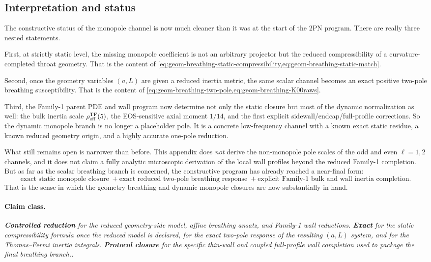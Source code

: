 \documentclass[11pt]{article}
\newcommand{\TwoPN}{\mathrm{2PN}}
\newcommand{\Exact}{\textbf{Exact}}
\newcommand{\Controlled}{\textbf{Controlled reduction}}
\newcommand{\Protocol}{\textbf{Protocol closure}}
\newcommand{\claimclass}[1]{\paragraph{Claim class.}\emph{#1.}}
\begin{document}
\subsection{Interpretation and status}
\label{app:geom-breathing-status}

The constructive status of the monopole channel is now much cleaner than it was at the
start of the \(\TwoPN\) program.
There are really three nested statements.

First, at strictly static level, the missing monopole coefficient is not an arbitrary
projector but the reduced compressibility of a curvature-completed throat geometry.
That is the content of
\cref{eq:geom-breathing-static-compressibility,eq:geom-breathing-static-match}.

Second, once the geometry variables \((a,L)\) are given a reduced inertia metric, the
same scalar channel becomes an exact positive two-pole breathing susceptibility.
That is the content of
\cref{eq:geom-breathing-two-pole,eq:geom-breathing-K00raws}.

Third, the Family-1 parent PDE and wall program now determine not only the static closure
but most of the dynamic normalization as well: the bulk inertia scale
\(\rho_{\rm eff}^{\rm TF}(5)\), the EOS-sensitive axial moment \(1/14\), and the first
explicit sidewall/endcap/full-profile corrections.
So the dynamic monopole branch is no longer a placeholder pole.
It is a concrete low-frequency channel with a known exact static residue, a known reduced
geometry origin, and a highly accurate one-pole reduction.

What still remains open is narrower than before.
This appendix does \emph{not} derive the non-monopole pole scales of the odd and even
\(\ell=1,2\) channels, and it does not claim a fully analytic microscopic derivation of
the local wall profiles beyond the reduced Family-1 completion.
But as far as the scalar breathing branch is concerned, the constructive program has
already reached a near-final form:
\begin{equation}
\boxed{
\text{exact static monopole closure}
\;+
\text{exact reduced two-pole breathing response}
\;+
\text{explicit Family-1 bulk and wall inertia completion}.
}
\label{eq:geom-breathing-final-summary}
\end{equation}
That is the sense in which the geometry-breathing and dynamic monopole closures are now
substantially in hand.

\claimclass{\Controlled{} for the reduced geometry-side model, affine breathing ansatz,
and Family-1 wall reductions.
\Exact{} for the static compressibility formula once the reduced model is declared, for
the exact two-pole response of the resulting \((a,L)\) system, and for the
Thomas--Fermi inertia integrals.
\Protocol{} for the specific thin-wall and coupled full-profile wall completion used to
package the final breathing branch.}
\end{document}
